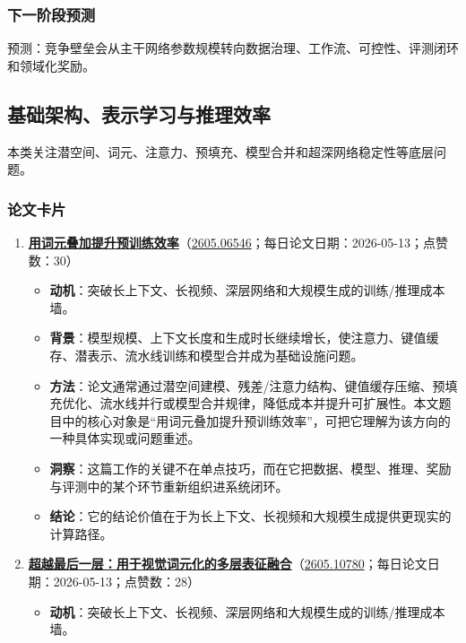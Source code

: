 \subsubsection{下一阶段预测}
预测：竞争壁垒会从主干网络参数规模转向数据治理、工作流、可控性、评测闭环和领域化奖励。

\subsection{基础架构、表示学习与推理效率}

本类关注潜空间、词元、注意力、预填充、模型合并和超深网络稳定性等底层问题。

\subsubsection{论文卡片}
\begin{enumerate}[leftmargin=1.5em]
  \item \textbf{\href{https://huggingface.co/papers/2605.06546}{用词元叠加提升预训练效率}}（\href{https://arxiv.org/abs/2605.06546}{2605.06546}；每日论文日期：2026-05-13；点赞数：30）
  \begin{itemize}[leftmargin=1.5em]
    \item \textbf{动机}：突破长上下文、长视频、深层网络和大规模生成的训练/推理成本墙。
    \item \textbf{背景}：模型规模、上下文长度和生成时长继续增长，使注意力、键值缓存、潜表示、流水线训练和模型合并成为基础设施问题。
    \item \textbf{方法}：论文通常通过潜空间建模、残差/注意力结构、键值缓存压缩、预填充优化、流水线并行或模型合并规律，降低成本并提升可扩展性。本文题目中的核心对象是“用词元叠加提升预训练效率”，可把它理解为该方向的一种具体实现或问题重述。
    \item \textbf{洞察}：这篇工作的关键不在单点技巧，而在它把数据、模型、推理、奖励与评测中的某个环节重新组织进系统闭环。
    \item \textbf{结论}：它的结论价值在于为长上下文、长视频和大规模生成提供更现实的计算路径。
  \end{itemize}
  \item \textbf{\href{https://huggingface.co/papers/2605.10780}{超越最后一层：用于视觉词元化的多层表征融合}}（\href{https://arxiv.org/abs/2605.10780}{2605.10780}；每日论文日期：2026-05-13；点赞数：28）
  \begin{itemize}[leftmargin=1.5em]
    \item \textbf{动机}：突破长上下文、长视频、深层网络和大规模生成的训练/推理成本墙。

\end{itemize}
\end{enumerate}
